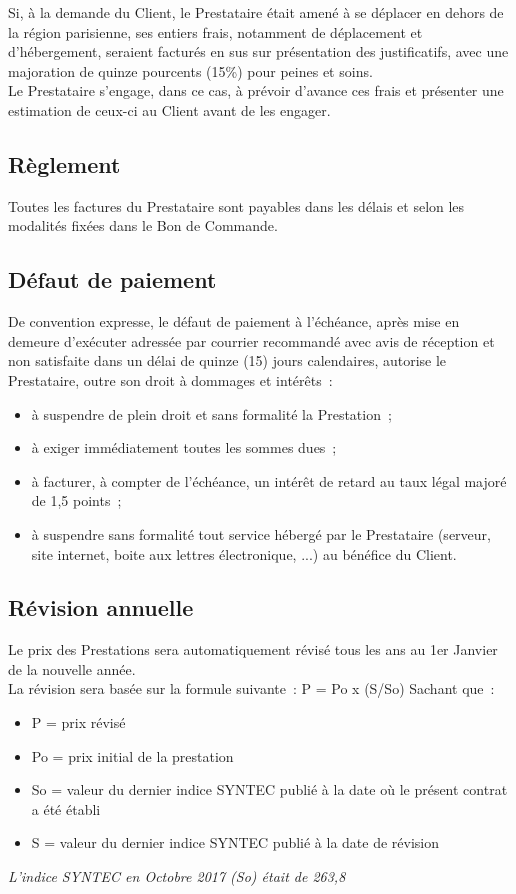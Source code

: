 \documentclass[9pt,french]{base}
\begin{document}
\begin{multicols*}{3}
Si, à la demande du Client, le Prestataire était amené à se déplacer en dehors de la région parisienne, ses entiers frais, notamment de déplacement et d’hébergement, seraient facturés en sus sur présentation des justificatifs, avec une majoration de quinze pourcents (15\%) pour peines et soins. \\
Le Prestataire s’engage, dans ce cas, à prévoir d’avance ces frais et présenter une estimation de ceux-ci au Client avant de les engager.

\subsection{Règlement}

Toutes les factures du Prestataire sont payables dans les délais et selon les modalités fixées dans le Bon de Commande.

\subsection{Défaut de paiement}

De convention expresse, le défaut de paiement à l’échéance, après mise en demeure d’exécuter adressée par courrier recommandé avec avis de réception et non satisfaite dans un délai de quinze (15) jours calendaires, autorise le Prestataire, outre son droit à dommages et intérêts~:
\begin{itemize}
  \item à suspendre de plein droit et sans formalité la Prestation~;
  \item à exiger immédiatement toutes les sommes dues~;
  \item à facturer, à compter de l’échéance, un intérêt de retard au taux légal majoré de 1,5 points~;
  \item à suspendre sans formalité tout service hébergé par le Prestataire (serveur, site internet, boite aux lettres électronique, ...) au bénéfice du Client.
\end{itemize}

\subsection{Révision annuelle}

Le prix des Prestations sera automatiquement révisé tous les ans au 1er Janvier de la nouvelle année. \\
La révision sera basée sur la formule suivante~: P = Po x (S/So)
Sachant que~:
\begin{itemize}
  \item P = prix révisé
  \item Po = prix initial de la prestation
  \item So = valeur du dernier indice SYNTEC publié à la date où le présent contrat a été établi
  \item S = valeur du dernier indice SYNTEC publié à la date de révision
\end{itemize}
{\itshape L’indice SYNTEC en Octobre 2017 (So) était de 263,8} \\


\end{multicols*}
\end{document}
